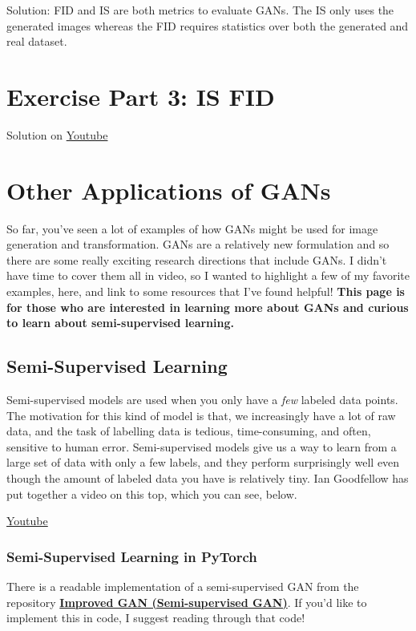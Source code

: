 Solution: FID and IS are both metrics to evaluate GANs. The IS only uses the generated images whereas the FID requires statistics over both the generated and real dataset.

\section{Exercise Part 3: IS FID}


Solution on \href{https://www.youtube.com/watch?v=UBrNxK0Gkao&t=2s}{Youtube}

\section{Other Applications of GANs}
So far, you've seen a lot of examples of how GANs might be used for image generation and transformation. GANs are a relatively new formulation and so there are some really exciting research directions that include GANs. I didn't have time to cover them all in video, so I wanted to highlight a few of my favorite examples, here, and link to some resources that I've found helpful! \textbf{This page is for those who are interested in learning more about GANs and curious to learn about semi-supervised learning.}

\subsection{Semi-Supervised Learning}

Semi-supervised models are used when you only have a \textit{few} labeled data points. The motivation for this kind of model is that, we increasingly have a lot of raw data, and the task of labelling data is tedious, time-consuming, and often, sensitive to human error. Semi-supervised models give us a way to learn from a large set of data with only a few labels, and they perform surprisingly well even though the amount of labeled data you have is relatively tiny. Ian Goodfellow has put together a video on this top, which you can see, below. \newline

\href{https://www.youtube.com/watch?v=_LRpHPxZaX0}{Youtube}
\subsubsection{Semi-Supervised Learning in PyTorch}
There is a readable implementation of a semi-supervised GAN from the repository \href{https://github.com/Sleepychord/ImprovedGAN-pytorch}{\textbf{Improved GAN (Semi-supervised GAN)}}. If you'd like to implement this in code, I suggest reading through that code!


